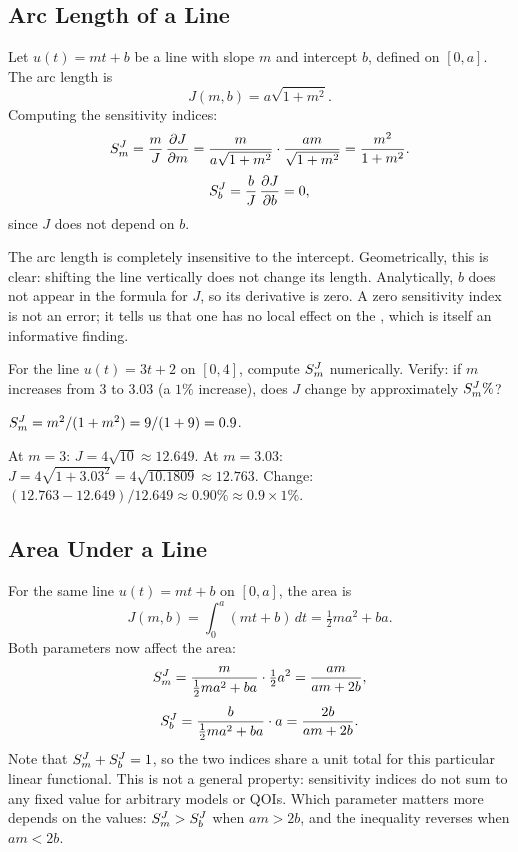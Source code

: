 \subsection{Arc Length of a Line}
\label{subsec:arclen}

Let $u(t) = mt + b$ be a line with slope $m$ and intercept $b$,
defined on $[0,a]$. The arc length is
\[
  J(m,b) = a\sqrt{1 + m^2}.
\]
Computing the sensitivity indices:
\begin{equation}
  S_{m}^{J} = \frac{m}{J}\,\frac{\partial J}{\partial m}
             = \frac{m}{a\sqrt{1+m^2}}\cdot\frac{am}{\sqrt{1+m^2}}
             = \frac{m^2}{1+m^2}.
\end{equation}
\begin{equation}
  S_{b}^{J} = \frac{b}{J}\,\frac{\partial J}{\partial b} = 0,
\end{equation}
since $J$ does not depend on $b$.

The arc length is completely insensitive to the intercept.
Geometrically, this is clear: shifting the line vertically does not
change its length. Analytically, $b$ does not appear in the formula
for $J$, so its derivative is zero. A zero sensitivity index is
not an error; it tells us that one \POI has no local effect
on the \QOI, which is itself an informative finding.

\begin{selfcheck}
For the line $u(t) = 3t + 2$ on $[0,4]$, compute $S_{m}^{J}$
numerically. Verify: if $m$ increases from $3$ to $3.03$ (a $1\%$ increase),
does $J$ change by approximately $S_{m}^{J}\%$?
\end{selfcheck}
\begin{scAnswer}
$S_{m}^{J} = m^2/(1+m^2) = 9/(1+9) = 0.9$.

At $m=3$: $J = 4\sqrt{10} \approx 12.649$.
At $m=3.03$: $J = 4\sqrt{1+3.03^2} = 4\sqrt{10.1809} \approx 12.763$.
Change: $(12.763 - 12.649)/12.649 \approx 0.90\% \approx 0.9 \times 1\%$. \checkmark
\end{scAnswer}

\subsection{Area Under a Line}
\label{subsec:area}

For the same line $u(t) = mt + b$ on $[0,a]$, the area is
\[
  J(m,b) = \int_0^a (mt + b)\,dt = \tfrac{1}{2}ma^2 + ba.
\]
Both parameters now affect the area:
\begin{equation}
  S_{m}^{J} = \frac{m}{\frac{1}{2}ma^2 + ba}\cdot\tfrac{1}{2}a^2
             = \frac{am}{am + 2b},
\end{equation}
\begin{equation}
  S_{b}^{J} = \frac{b}{\frac{1}{2}ma^2 + ba}\cdot a
             = \frac{2b}{am + 2b}.
\end{equation}
Note that $S_{m}^{J} + S_{b}^{J} = 1$, so the two indices
share a unit total for this particular linear functional.
This is not a general property: sensitivity indices do not
sum to any fixed value for arbitrary models or QOIs. Which parameter matters more depends on the
values: $S_{m}^{J} > S_{b}^{J}$ when $am > 2b$, and the
inequality reverses when $am < 2b$.

